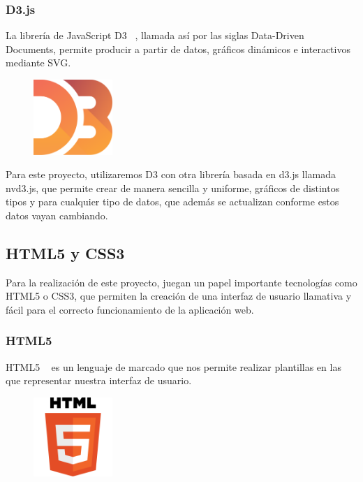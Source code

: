 \documentclass[a4paper, spanish, 12pt]{book}
\begin{document}
\subsubsection*{D3.js}
\label{subsec:d3}

La librer\'ia de JavaScript D3 ~\cite{d3}, llamada as\'i por las siglas Data-Driven Documents,
permite producir a partir de datos, gr\'aficos din\'amicos e interactivos mediante SVG.

\begin{figure}[H]
  \centering
  \includegraphics[width=3cm, keepaspectratio]{img/d3-logo}
\end{figure}

Para este proyecto, utilizaremos D3 con otra librer\'ia basada en d3.js llamada nvd3.js, que permite
crear de manera sencilla y uniforme, gr\'aficos de distintos tipos y para cualquier
tipo de datos, que adem\'as se actualizan conforme estos datos vayan cambiando.

\subsection{HTML5 y CSS3}
\label{subsec:html5css3}

Para la realizaci\'on de este proyecto, juegan un papel importante tecnolog\'ias
como HTML5 o CSS3, que permiten la creaci\'on de una interfaz de usuario llamativa
y f\'acil para el correcto funcionamiento de la aplicaci\'on web.

\subsubsection*{HTML5}
\label{subsec:html5}

HTML5 ~\cite{html5} es un lenguaje de marcado que nos permite realizar plantillas en las que
representar nuestra interfaz de usuario.

\begin{figure}[H]
  \centering
  \includegraphics[width=3cm, keepaspectratio]{img/html5-logo}
\end{figure}
\end{document}

